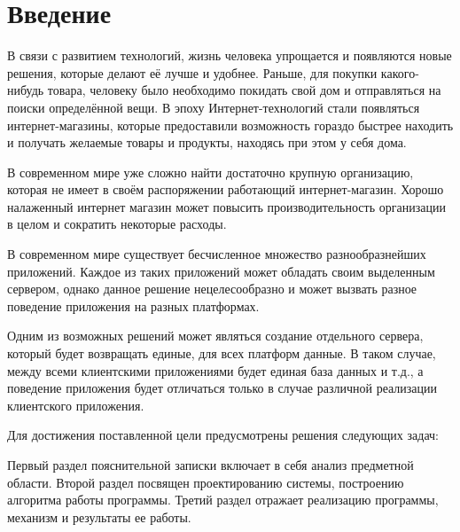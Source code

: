 \label{sec:intro}
\section*{Введение}\indent

В связи с развитием технологий, жизнь человека упрощается и появляются новые решения, которые делают её лучше и удобнее. 
Раньше, для покупки какого-нибудь товара, человеку было необходимо покидать свой дом и отправляться на поиски определённой вещи.
В эпоху Интернет-технологий стали появляться интернет-магазины, которые предоставили возможность гораздо быстрее находить и получать желаемые товары и продукты, находясь при этом у себя дома.

В современном мире уже сложно найти достаточно крупную организацию, которая не имеет в своём распоряжении работающий интернет-магазин.
Хорошо налаженный интернет магазин может повысить производительность организации в целом и сократить некоторые расходы.

В современном мире существует бесчисленное множество разнообразнейших приложений. 
Каждое из таких приложений может обладать своим выделенным сервером, однако данное решение нецелесообразно и может вызвать разное поведение приложения на разных платформах.

Одним из возможных решений может являться создание отдельного сервера, который будет возвращать единые, для всех платформ данные. 
В таком случае, между всеми клиентскими приложениями будет единая база данных и т.д., а поведение приложения будет отличаться только в случае различной реализации клиентского приложения.


Для достижения поставленной цели предусмотрены решения следующих задач:


Первый раздел пояснительной записки включает в себя анализ предметной области.
Второй раздел посвящен проектированию системы, построению алгоритма работы программы.
Третий раздел отражает реализацию программы, механизм и результаты ее работы.
